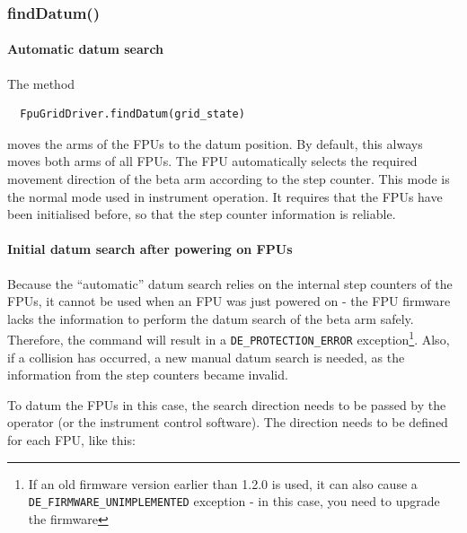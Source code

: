 \documentclass[11pt,a4paper]{scrartcl}
\begin{document}
\subsubsection{findDatum()}
\label{sec:finddatum}

\paragraph{Automatic datum search}

The method
\begin{verbatim}
  FpuGridDriver.findDatum(grid_state)
\end{verbatim}
moves the arms of the FPUs to the datum position.  By default, this
always moves both arms of all FPUs. The FPU automatically selects the
required movement direction of the beta arm according to the step
counter. This mode is the normal mode used in instrument operation. It
requires that the FPUs have been initialised before, so that the step
counter information is reliable.


\paragraph{Initial datum search after powering on FPUs}
\label{sec:refinitialsearch}

 Because
the ``automatic'' datum search relies on the internal step counters of
the FPUs, it cannot be used when an FPU was just powered on - the FPU
firmware lacks the information to perform the datum search of the beta
arm safely. Therefore, the command will result in a
\texttt{DE\_PROTECTION\_ERROR} exception\footnote{If an old firmware
  version earlier than 1.2.0 is used, it can also cause a
  \texttt{DE\_FIRMWARE\_UNIMPLEMENTED} exception - in this case, you
  need to upgrade the firmware}. Also, if a collision has occurred, a
new manual datum search is needed, as the information from the step
counters became invalid.

To datum the FPUs in this case, the search direction needs to be
passed by the operator (or the instrument control software). The
direction needs to be defined for each FPU, like this:
\end{document}
